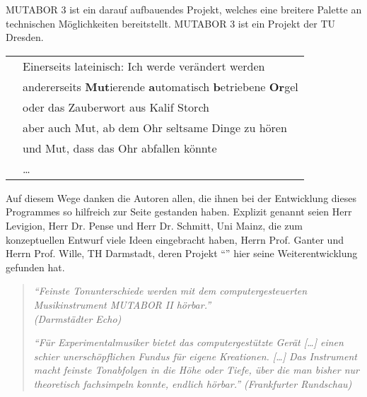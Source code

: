 MUTABOR 3 ist ein darauf aufbauendes Projekt, welches eine 
breitere Palette an technischen Möglichkeiten bereitstellt. MUTABOR 3
ist ein Projekt der TU Dresden.

\begin{tabular}{l@{\ \ --\ \ \ }l}
\mutabor{}  & Einerseits lateinisch: Ich werde verändert werden \\
\mutabor{}  & andererseits \textbf{Mut}ierende \textbf{a}utomatisch 
               \textbf{b}etriebene \textbf{Or}gel  \\
\mutabor{}  & oder das Zauberwort aus Kalif Storch \\
\mutabor{}  & aber auch Mut, ab dem Ohr seltsame Dinge zu hören \\
\mutabor{}  & und Mut, dass das Ohr abfallen könnte \\
\mutabor{}  & \ldots \\
\end{tabular}

 Auf diesem Wege danken die Autoren allen, die ihnen
bei der Entwicklung dieses Programmes so hilfreich zur Seite gestanden
haben. Explizit genannt seien Herr Levigion, Herr Dr. Pense und Herr
Dr. Schmitt, Uni Mainz, die zum konzeptuellen Entwurf viele Ideen
eingebracht haben, Herrn Prof. Ganter und Herrn Prof. Wille, TH
Darmstadt, deren Projekt "`\mutabor{}"' hier seine Weiterentwicklung
gefunden hat.

\vspace{2cm}

\begin{quotation}
\parbox[t]{7cm}{\itshape
"`Feinste Tonunterschiede werden mit dem computergesteuerten
Musikinstrument MUTABOR II hörbar."'\\ \rmfamily (Darmstädter Echo)
} \hfill \parbox[t]{7cm}{\itshape
"`Für Experimentalmusiker bietet das computergestützte Gerät [\dots{}] einen
schier unerschöpflichen Fundus für eigene Kreationen. [\dots{}] Das Instrument
macht feinste Tonabfolgen in die Höhe oder Tiefe, über die man bisher nur
theoretisch fachsimpeln konnte, endlich hörbar."' \rmfamily (Frankfurter Rundschau)}
\end{quotation}

\ifhtml\else\clearpage\fi

%


\iffalse
{}

